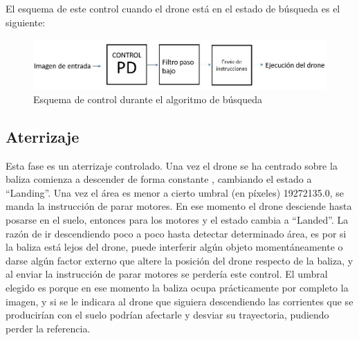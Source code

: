 \hspace{1 cm} El esquema de este control cuando el drone est\'a en el estado de b\'usqueda es el siguiente:
\begin{figure}[ht]
	\centering
		\includegraphics[width=1\textwidth]{imgs/esquemapd2.png}
        \caption{Esquema de control durante el algoritmo de b\'usqueda}
	\label{fig:Esquema_control}
\end{figure}


\subsection{Aterrizaje}

\hspace{1 cm} Esta fase es un aterrizaje controlado. Una vez el drone se ha centrado sobre la baliza comienza a descender de forma constante , cambiando el estado a "`Landing"'. Una vez el \'area es menor a cierto umbral (en p\'ixeles) 19272135.0, se manda la instrucci\'on de parar motores. En ese momento el drone desciende hasta posarse en el suelo, entonces para los motores y el estado cambia a "`Landed"'. La raz\'on de ir descendiendo poco a poco hasta detectar determinado \'area, es por si la baliza est\'a lejos del drone, puede interferir alg\'un objeto moment\'aneamente o darse alg\'un factor externo que altere la posici\'on del drone respecto de la baliza, y al enviar la instrucci\'on de parar motores se perder\'ia este control. El umbral elegido es porque en ese momento la baliza ocupa pr\'acticamente por completo la imagen, y si se le indicara al drone que siguiera descendiendo las corrientes que se producir\'ian con el suelo podr\'ian afectarle y desviar su trayectoria, pudiendo perder la referencia.









